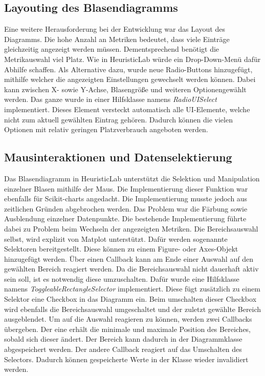 \subsection{Layouting des Blasendiagramms}
\label{subsec:impl_bubble_layout}
\noindent Eine weitere Herausforderung bei der Entwicklung war das Layout des Diagramms. Die hohe Anzahl an Metriken bedeutet, dass viele Einträge gleichzeitig angezeigt werden müssen. Dementsprechend benötigt die Metrikauswahl viel Platz. Wie in HeuristicLab würde ein Drop-Down-Menü dafür Abhilfe schaffen. Als Alternative dazu, wurde neue Radio-Buttons hinzugefügt, mithilfe welcher die angezeigten Einstellungen gewechselt werden können. Dabei kann zwischen X- sowie Y-Achse, Blasengröße und weiteren Optionen\linebreak gewählt werden. Das ganze wurde in einer Hilfsklasse namens \emph{RadioUISelect} implementiert. Dieses Element versteckt automatisch alle UI-Elemente, welche nicht zum aktuell gewählten Eintrag gehören. Dadurch können die vielen Optionen mit relativ geringen Platzverbrauch angeboten werden.

\subsection{Mausinteraktionen und Datenselektierung}
\label{subsec:impl_mouse}

\noindent Das Blasendiagramm in HeuristicLab unterstützt die Selektion und Manipulation einzelner Blasen mithilfe der Maus. Die Implementierung dieser Funktion war ebenfalls für Scikit-charts angedacht. Die Implementierung musste jedoch aus zeitlichen Gründen abgebrochen werden. Das Problem war die Färbung sowie Ausblendung einzelner Datenpunkte. Die bestehende Implementierung führte dabei zu Problem beim Wechseln der angezeigten Metriken. Die Bereichsauswahl selbst, wird explizit von Matplot unterstützt. Dafür werden sogenannte Selektoren bereitgestellt. Diese können zu einem Figure- oder Axes-Objekt hinzugefügt werden. Über einen Callback kann am Ende einer Auswahl auf den gewählten Bereich reagiert werden. Da die Bereichsauswahl nicht dauerhaft aktiv sein soll, ist es notwendig diese umzuschalten. Dafür wurde eine Hilfsklasse namens \emph{ToggleableRectangleSelector} implementiert. Diese fügt zusätzlich zu einem Selektor eine Checkbox in das Diagramm ein. Beim umschalten dieser Checkbox wird ebenfalls die Bereichsauswahl umgeschaltet und der zuletzt gewählte Bereich ausgeblendet. Um auf die Auswahl reagieren zu können, werden zwei Callbacks übergeben. Der eine erhält die minimale und maximale Position des Bereiches, sobald sich dieser ändert. Der Bereich kann dadurch in der Diagrammklasse abgespeichert werden. Der andere Callback reagiert auf das Umschalten des Selectors. Dadurch können gespeicherte Werte in der Klasse wieder invalidiert werden.


